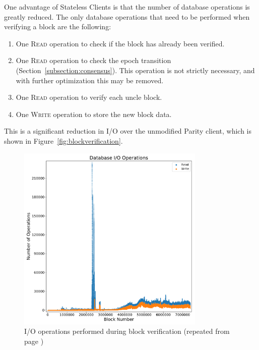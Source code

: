 \documentclass[12pt]{article}
\newcommand{\System}{Stateless Clients\xspace}
\newcommand{\figurewidth}{0.8\textwidth}
\newcommand{\repeatcaption}[2]{%
  \renewcommand{\thefigure}{\ref{#1}}%
  \captionsetup{list=no}%
  \caption{#2 (repeated from page \pageref{#1})}%
}
\begin{document}
One advantage of \System is that the number of database operations is greatly reduced. The only database operations that need to be performed when verifying a block are the following:
\begin{enumerate}
  \item One \textsc{Read} operation to check if the block has already been verified.
  \item One \textsc{Read} operation to check the epoch transition (Section~\ref{subsection:consensus}). This operation is not strictly necessary, and with further optimization this may be removed.
  \item One \textsc{Read} operation to verify each uncle block.
  \item One \textsc{Write} operation to store the new block data.
\end{enumerate}

This is a significant reduction in I/O over the unmodified Parity client, which is shown in Figure~\ref{fig:blockverification}.

\begin{figure}[H]
  \centering
  \includegraphics[width=\figurewidth]{../figures/results/graphs/background/db-io-ops.pdf}
  \repeatcaption{fig:blockverification}{I/O operations performed during block verification}
\end{figure}
\end{document}
